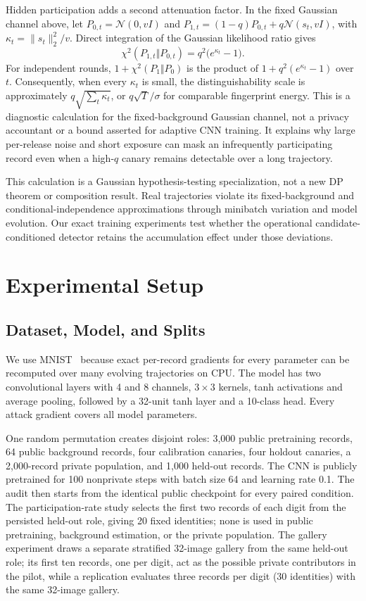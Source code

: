 \documentclass[conference]{IEEEtran}
\newcommand{\Normal}{\mathcal{N}}
\begin{document}
Hidden participation adds a second attenuation factor. In the fixed Gaussian
channel above, let $P_{0,t}=\Normal(0,vI)$ and
$P_{1,t}=(1-q)P_{0,t}+q\Normal(s_t,vI)$, with
$\kappa_t=\lVert s_t\rVert_2^2/v$. Direct integration of the Gaussian
likelihood ratio gives
\begin{equation}
\chi^2(P_{1,t}\Vert P_{0,t})=q^2\bigl(e^{\kappa_t}-1\bigr).
\label{eq:participation-chi2}
\end{equation}
For independent rounds, $1+\chi^2(P_1\Vert P_0)$ is the product of
$1+q^2(e^{\kappa_t}-1)$ over $t$. Consequently, when every $\kappa_t$ is
small, the distinguishability scale is approximately
$q\sqrt{\sum_t\kappa_t}$, or $q\sqrt{T}/\sigma$ for comparable
fingerprint energy. This is a diagnostic calculation for the fixed-background
Gaussian channel, not a privacy accountant or a bound asserted for adaptive
CNN training. It explains why large per-release noise and short exposure can
mask an infrequently participating record even when a high-$q$ canary remains
detectable over a long trajectory.

This calculation is a Gaussian hypothesis-testing specialization, not a new DP theorem or composition result. Real trajectories violate its fixed-background and conditional-independence approximations through minibatch variation and model evolution. Our exact training experiments test whether the operational candidate-conditioned detector retains the accumulation effect under those deviations.

\section{Experimental Setup}

\subsection{Dataset, Model, and Splits}

We use MNIST~\cite{lecun1998gradient} because exact per-record gradients for every parameter can be recomputed over many evolving trajectories on CPU. The model has two convolutional layers with 4 and 8 channels, $3\times3$ kernels, tanh activations and average pooling, followed by a 32-unit tanh layer and a 10-class head. Every attack gradient covers all model parameters.

One random permutation creates disjoint roles: 3,000 public pretraining records, 64 public background records, four calibration canaries, four holdout canaries, a 2,000-record private population, and 1,000 held-out records. The CNN is publicly pretrained for 100 nonprivate steps with batch size 64 and learning rate 0.1. The audit then starts from the identical public checkpoint for every paired condition. The participation-rate study selects the first two records of each digit from the persisted held-out role, giving 20 fixed identities; none is used in public pretraining, background estimation, or the private population. The gallery experiment draws a separate stratified 32-image gallery from the same held-out role; its first ten records, one per digit, act as the possible private contributors in the pilot, while a replication evaluates three records per digit (30 identities) with the same 32-image gallery.
\end{document}
